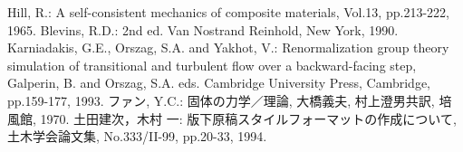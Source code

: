 \documentclass{jsce}
\begin{document}
\begin{thebibliography}{20}
 Hill, R.: A self-consistent mechanics of composite materials,
  Vol.13, pp.213-222, 1965.
 Blevins, R.D.:
  2nd ed.
 Van Nostrand Reinhold, New York, 1990.
 Karniadakis, G.E., Orszag, S.A. and Yakhot, V.:
 Renormalization group theory simulation of
 transitional and turbulent flow over a backward-facing step,
  Galperin, B. and Orszag, S.A. eds.
 Cambridge University Press, Cambridge, pp.159-177, 1993.
 ファン, Y.C.:
 \newblock 固体の力学／理論,
 \newblock 大橋義夫, 村上澄男共訳, 培風館, 1970.
 土田建次，木村 一:
 \newblock 版下原稿スタイルフォーマットの作成について,
 \newblock 土木学会論文集, No.333/II-99, pp.20-33, 1994.
\end{thebibliography}

\lastpagesettings

\end{document}
